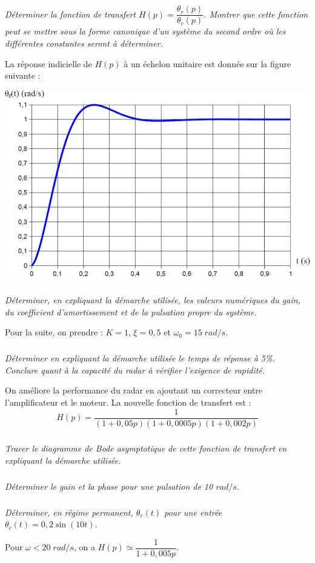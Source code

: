 \documentclass[10pt]{article}
\begin{document}
 
 \subparagraph{}
 \textit{Déterminer la fonction de transfert $H(p)=\dfrac{\theta_r(p)}{\theta_c(p)}$. Montrer que cette fonction peut se mettre sous la forme canonique d'un système du second ordre où les différentes constantes seront à déterminer.}
 
 La réponse indicielle de $H(p)$ à un échelon unitaire est donnée sur la figure suivante : 
 
 \begin{center}
\includegraphics[width=.8\textwidth]{images/exo1_2}
\end{center}
 
 \subparagraph{}
 \textit{Déterminer, en expliquant la démarche utilisée, les valeurs numériques du gain, du coefficient d'amortissement et de la pulsation propre du système.}
 
 Pour la suite, on prendre : $K=1$, $\xi=0,5$ et $\omega_0 = 15\; rad/s$.
 
 
 
 \subparagraph{}
 \textit{Déterminer en expliquant la démarche utilisée le temps de réponse à 5\%. Conclure quant à la capacité du radar à vérifier l'exigence de rapidité.}
 
 On améliore la performance du radar en ajoutant un correcteur entre l'amplificateur et le moteur. 
 La nouvelle fonction de transfert est : 
 $$
 H(p)=\dfrac{1}{\left(1+0,05p \right)\left(1+0,0005p \right)\left(1+0,002p \right)}
 $$
 \subparagraph{}
 \textit{Tracer le diagramme de Bode asymptotique de cette fonction de transfert en expliquant la démarche utilisée. }
 
 
 \subparagraph{}
 \textit{Déterminer le gain et la phase pour une pulsation de 10 $rad/s$.}

\subparagraph{}
\textit{Déterminer, en régime permanent, $\theta_r(t)$ pour une entrée $\theta_c(t)=0,2 \sin (10t)$.}

Pour $\omega<20\; rad/s$, on a $H(p)\simeq \dfrac{1}{1+0,005p}$.
\end{document}
